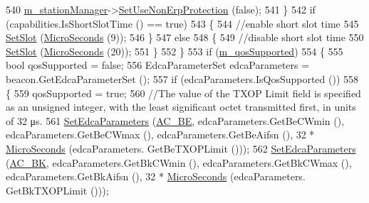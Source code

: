\begin{DoxyCode}
540                   \hyperlink{classns3_1_1RegularWifiMac_a76d1a5e27b64bfe36f24a55d1eea2775}{m\_stationManager}->\hyperlink{classns3_1_1WifiRemoteStationManager_a409e92951019a05af1266a30c14995d2}{SetUseNonErpProtection} (\textcolor{keyword}{false});
541                 \}
542               \textcolor{keywordflow}{if} (capabilities.IsShortSlotTime () == \textcolor{keyword}{true})
543                 \{
544                   \textcolor{comment}{//enable short slot time}
545                   \hyperlink{classns3_1_1RegularWifiMac_a71241af3585e17c102e51576f19a49b9}{SetSlot} (\hyperlink{group__timecivil_ga17465a639c8d1464e76538afdd78a9f0}{MicroSeconds} (9));
546                 \}
547               \textcolor{keywordflow}{else}
548                 \{
549                   \textcolor{comment}{//disable short slot time}
550                   \hyperlink{classns3_1_1RegularWifiMac_a71241af3585e17c102e51576f19a49b9}{SetSlot} (\hyperlink{group__timecivil_ga17465a639c8d1464e76538afdd78a9f0}{MicroSeconds} (20));
551                 \}
552             \}
553           \textcolor{keywordflow}{if} (\hyperlink{classns3_1_1RegularWifiMac_aeecdb918687493a8efdd70304bc0cee9}{m\_qosSupported})
554             \{
555               \textcolor{keywordtype}{bool} qosSupported = \textcolor{keyword}{false};
556               EdcaParameterSet edcaParameters = beacon.GetEdcaParameterSet ();
557               \textcolor{keywordflow}{if} (edcaParameters.IsQosSupported ())
558                 \{
559                   qosSupported = \textcolor{keyword}{true};
560                   \textcolor{comment}{//The value of the TXOP Limit field is specified as an unsigned integer, with the least
       significant octet transmitted first, in units of 32 μs.}
561                   \hyperlink{classns3_1_1StaWifiMac_a9963539876f26c21aa9866bcf998cda7}{SetEdcaParameters} (\hyperlink{group__wifi_ggab422b4562ba272b39a9b6bca3513f3aca136016fc12611734060b599355503c29}{AC\_BE}, edcaParameters.GetBeCWmin (), 
      edcaParameters.GetBeCWmax (), edcaParameters.GetBeAifsn (), 32 * \hyperlink{group__timecivil_ga17465a639c8d1464e76538afdd78a9f0}{MicroSeconds} (edcaParameters.
      GetBeTXOPLimit ()));
562                   \hyperlink{classns3_1_1StaWifiMac_a9963539876f26c21aa9866bcf998cda7}{SetEdcaParameters} (\hyperlink{group__wifi_ggab422b4562ba272b39a9b6bca3513f3aca53e99420c645076e74307112d73eb38b}{AC\_BK}, edcaParameters.GetBkCWmin (), 
      edcaParameters.GetBkCWmax (), edcaParameters.GetBkAifsn (), 32 * \hyperlink{group__timecivil_ga17465a639c8d1464e76538afdd78a9f0}{MicroSeconds} (edcaParameters.
      GetBkTXOPLimit ()));

\end{DoxyCode}
